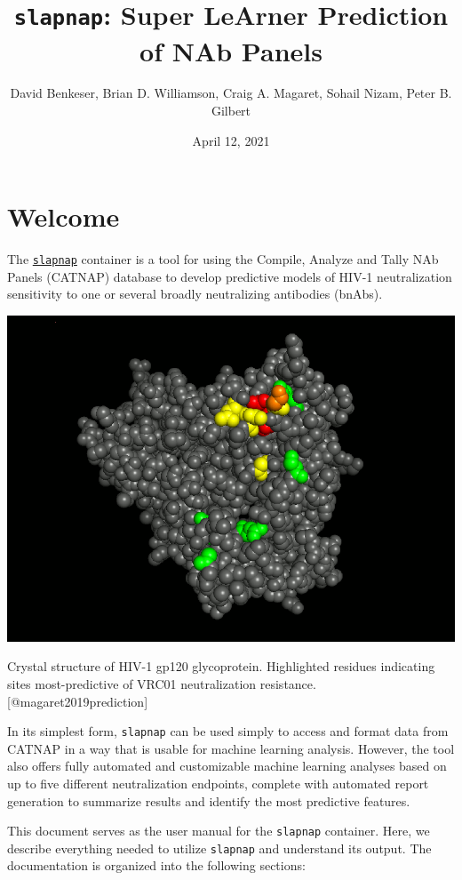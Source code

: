 \documentclass[]{article}
\title{\texttt{slapnap}: Super LeArner Prediction of NAb Panels}
\author{David Benkeser, Brian D. Williamson, Craig A. Magaret, Sohail Nizam,
Peter B. Gilbert}
\date{April 12, 2021}
\begin{document}
\maketitle

{
\setcounter{tocdepth}{2}
\tableofcontents
}
\section*{Welcome}\label{welcome}

The \href{https://hub.docker.com/r/slapnap/slapnap}{\texttt{slapnap}}
container is a tool for using the Compile, Analyze and Tally NAb Panels
(CATNAP) database to develop predictive models of HIV-1 neutralization
sensitivity to one or several broadly neutralizing antibodies (bnAbs).

\begin{center}\includegraphics[width=0.7\linewidth]{gp120} \end{center}\begin{center}
Crystal structure of HIV-1 gp120 glycoprotein. Highlighted residues
indicating sites most-predictive of VRC01 neutralization resistance.
{[}@magaret2019prediction{]}
\end{center}

In its simplest form, \texttt{slapnap} can be used simply to access and
format data from CATNAP in a way that is usable for machine learning
analysis. However, the tool also offers fully automated and customizable
machine learning analyses based on up to five different neutralization
endpoints, complete with automated report generation to summarize
results and identify the most predictive features.

This document serves as the user manual for the \texttt{slapnap}
container. Here, we describe everything needed to utilize
\texttt{slapnap} and understand its output. The documentation is
organized into the following sections:
\end{document}
